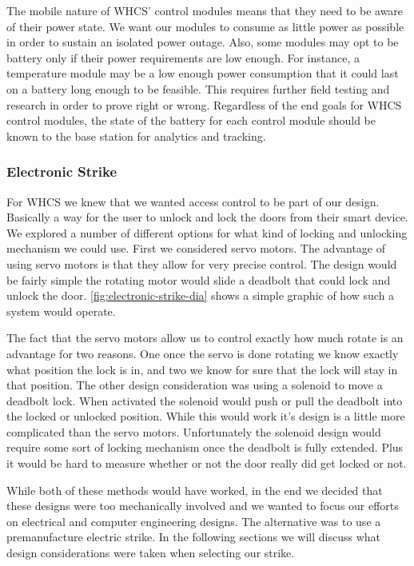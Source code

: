 The mobile nature of WHCS' control modules means that they need to be aware of
their power state. We want our modules to consume as little power as possible
in order to sustain an isolated power outage. Also, some modules may opt to be
battery only if their power requirements are low enough. For instance, a
temperature module may be a low enough power consumption that it could last on
a battery long enough to be feasible. This requires further field testing and
research in order to prove right or wrong. Regardless of the end goals for WHCS
control modules, the state of the battery for each control module should be
known to the base station for analytics and tracking.

\subsubsection{Electronic Strike}

\label{sec:electronic-strike}

For WHCS we knew that we wanted access control to be part of our design.
Basically a way for the user to unlock and lock the doors from their smart
device. We explored a number of different options for what kind of locking and
unlocking mechanism we could use. First we considered servo motors. The
advantage of using servo motors is that they allow for very precise control.
The design would be fairly simple the rotating motor would slide a deadbolt
that could lock and unlock the door. \autoref{fig:electronic-strike-dia} shows a simple
graphic of how such a system would operate.

 
The fact that the servo motors allow us to control exactly how much rotate is
an advantage for two reasons. One once the servo is done rotating we know
exactly what position the lock is in, and two we know for sure that the lock
will stay in that position. The other design consideration was using a solenoid
to move a deadbolt lock. When activated the solenoid would push or pull the
deadbolt into the locked or unlocked position. While this would work it{}'s
design is a little more complicated than the servo motors. Unfortunately the
solenoid design would require some sort of locking mechanism once the deadbolt
is fully extended. Plus it would be hard to measure whether or not the door
really did get locked or not.

While both of these methods would have worked, in the end we decided that these
designs were too mechanically involved and we wanted to focus our efforts on
electrical and computer engineering designs. The alternative was to use a
premanufacture electric strike. In the following sections we will discuss what
design considerations were taken when selecting our strike.

